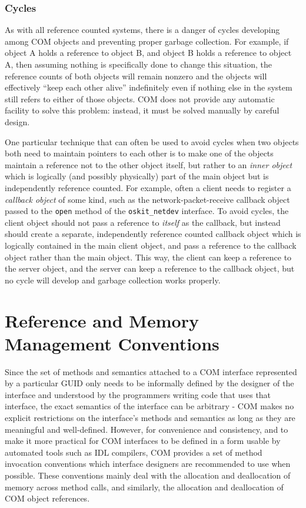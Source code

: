 \subsubsection{Cycles}

As with all reference counted systems,
there is a danger of cycles developing among COM objects
and preventing proper garbage collection.
For example, if object A holds a reference to object B,
and object B holds a reference to object A,
then assuming nothing is specifically done to change this situation,
the reference counts of both objects will remain nonzero
and the objects will effectively ``keep each other alive'' indefinitely
even if nothing else in the system
still refers to either of those objects.
COM does not provide any automatic facility to solve this problem:
instead, it must be solved manually by careful design.

One particular technique that can often be used to avoid cycles
when two objects both need to maintain pointers to each other
is to make one of the objects maintain a reference
not to the other object itself,
but rather to an \emph{inner object}
which is logically (and possibly physically) part of the main object
but is independently reference counted.
For example,
often a client needs to register a \emph{callback object} of some kind,
such as the network-packet-receive callback object
passed to the \texttt{open} method of the \texttt{oskit_netdev} interface.
To avoid cycles,
the client object should not pass a reference to \emph{itself} as the callback,
but instead should create
a separate, independently reference counted callback object
which is logically contained in the main client object,
and pass a reference to the callback object rather than the main object.
This way, the client can keep a reference to the server object,
and the server can keep a reference to the callback object,
but no cycle will develop and garbage collection works properly.

\section{Reference and Memory Management Conventions}

Since the set of methods and semantics
attached to a COM interface represented by a particular GUID
only needs to be informally defined by the designer of the interface
and understood by the programmers writing code that uses that interface,
the exact semantics of the interface can be arbitrary -
COM makes no explicit restrictions on the interface's methods and semantics
as long as they are meaningful and well-defined.
However, for convenience and consistency,
and to make it more practical for COM interfaces
to be defined in a form usable by automated tools such as IDL compilers,
COM provides a set of method invocation conventions
which interface designers are recommended to use when possible.
These conventions mainly deal with
the allocation and deallocation of memory across method calls,
and similarly,
the allocation and deallocation of COM object references.


